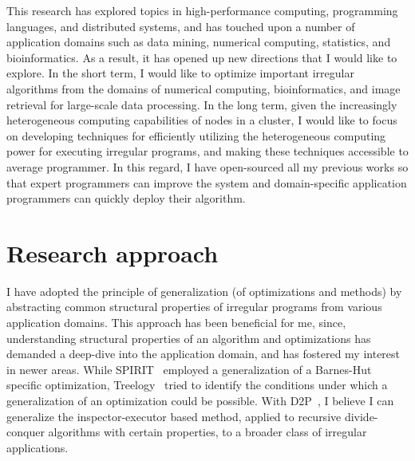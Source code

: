 This research has explored topics in high-performance computing, programming languages, and distributed systems, and has touched upon a number of application domains such as data mining, numerical computing, statistics, and bioinformatics. 
As a result, it has opened up new directions that I would like to explore. In the short term, I would like to optimize important irregular algorithms from the domains of numerical computing, bioinformatics, and image retrieval for large-scale data processing.
In the long term, given the increasingly heterogeneous computing capabilities of nodes in a cluster, I would like to focus on developing techniques for efficiently utilizing the heterogeneous computing power for executing irregular programs, and making these techniques accessible to average programmer. 
In this regard, I have open-sourced all my previous works so that expert programmers can improve the system and domain-specific application programmers can quickly deploy their algorithm.  

\section*{Research approach} I have adopted the principle of generalization (of optimizations and methods) by abstracting common structural properties of irregular programs from various application domains. 
This approach has been beneficial for me, since, understanding structural properties of an algorithm and optimizations has demanded a deep-dive into the application domain, and has fostered my interest in newer areas. 
While SPIRIT~\cite{hegde17ics} employed a generalization of a Barnes-Hut specific optimization, Treelogy~\cite{hegde17ispass} tried to identify the conditions under which a generalization of an optimization could be possible.
With D2P~\cite{hegde19d2p}, I believe I can generalize the inspector-executor based method, applied to recursive divide-conquer algorithms with certain properties, to a broader class of irregular applications.  
    
